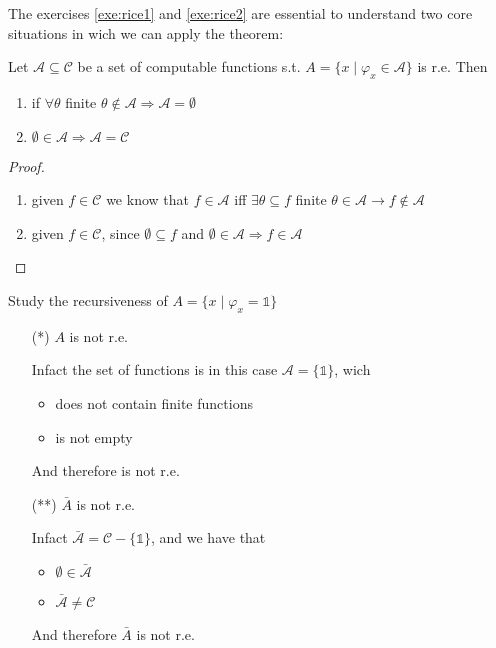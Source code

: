 The exercises \ref{exe:rice1} and \ref{exe:rice2} are essential to
understand two core situations in wich we can apply the theorem:

\begin{observation}
  Let $\mathcal{A} \subseteq \mathcal{C}$ be a set of computable
  functions s.t. $A = \{ x \mid \varphi_x \in \mathcal{A}\}$ is
  r.e. Then
  \begin{enumerate}[label=(i)]
  \item if \(\forall \theta \) finite
    \( \theta \notin \mathcal{A} \Rightarrow \mathcal{A} = \emptyset\)
  \item
    \(\emptyset \in \mathcal{A} \Rightarrow \mathcal{A} =
    \mathcal{C}\)
  \end{enumerate}

  \begin{proof}
    \begin{enumerate}[label=(i)]
    \item given $f \in \mathcal{C}$ we know that $f \in \mathcal{A}$
      iff $\exists \theta \subseteq f$ finite
      $\theta \in \mathcal{A} \rightarrow f \notin \mathcal{A}$
    \item given $f \in \mathcal{C}$, since $\emptyset \subseteq f$ and
      $\emptyset \in \mathcal{A} \Rightarrow f \in \mathcal{A}$
    \end{enumerate}
  \end{proof}
\end{observation}

\begin{exercise}
  Study the recursiveness of $A = \{x \mid \varphi_x = \mathds{1}\}$

  \begin{enumerate}
  \item[(*)] $A$ is not r.e.

    Infact the set of functions is in this case
    $\mathcal{A} = \{\mathds{1}\}$, wich
    \begin{itemize}
    \item does not contain finite functions
    \item is not empty
    \end{itemize}
    And therefore is not r.e.

  \item[(**)] $\bar{A}$ is not r.e.

    Infact $\bar{\mathcal{A}} = \mathcal{C} - \{\mathds{1}\}$, and we
    have that
    \begin{itemize}
    \item $\emptyset \in \bar{\mathcal{A}}$
    \item $\bar{\mathcal{A}} \neq \mathcal{C}$
    \end{itemize}
    And therefore $\bar{A}$ is not r.e.
  \end{enumerate}
\end{exercise}

